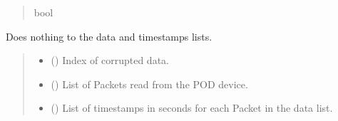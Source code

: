 \documentclass[letterpaper,10pt,english]{sphinxmanual}
\begin{document}
\begin{fulllineitems}
\begin{fulllineitems}
\begin{quote}
\begin{description}
\sphinxAtStartPar
bool

\end{description}\end{quote}

\end{fulllineitems}


\begin{fulllineitems}
\label{\detokenize{PodApi.Stream.Collect:PodApi.Stream.Collect.DataHose.Hose._Filter_DoNothing}}
\pysigstartsignatures
{}
\pysigstopsignatures
\sphinxAtStartPar
Does nothing to the data and timestamps lists.
\begin{quote}\begin{description}
\begin{itemize}
\item {} 
\sphinxAtStartPar
{} () \textendash{} Index of corrupted data.

\item {} 
\sphinxAtStartPar
{} (\sphinxstyleliteralemphasis{\sphinxupquote{{[}}}{\hyperref[\detokenize{PodApi.Packets:PodApi.Packets.Packet.Packet}]{\sphinxcrossref{\sphinxstyleliteralemphasis{\sphinxupquote{Packet}}}}}\sphinxstyleliteralemphasis{\sphinxupquote{ | }}\sphinxstyleliteralemphasis{\sphinxupquote{{]}}}) \textendash{} List of Packets read from the POD device.

\item {} 
\sphinxAtStartPar
{} (\sphinxstyleliteralemphasis{\sphinxupquote{{[}}}\sphinxstyleliteralemphasis{\sphinxupquote{{]}}}) \textendash{} List of timestamps in seconds for each Packet                 in the data list.


\end{itemize}
\end{description}
\end{quote}
\end{fulllineitems}
\end{fulllineitems}
\end{document}
